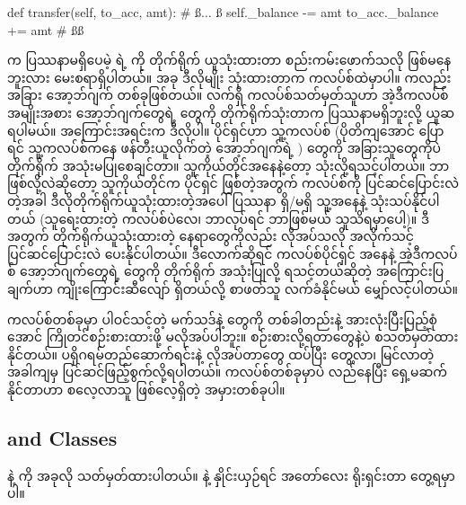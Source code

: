 %
\begin{py}
def transfer(self, to_acc, amt):
    # ß$\ldots$ ß
    self._balance -= amt
    to_acc._balance += amt # ßß
\end{py}
%
 က ပြဿနာမရှိပေမဲ့  ရဲ့   ကို တိုက်ရိုက် ယူသုံးထားတာ  စည်းကမ်းဖောက်သလို ဖြစ်မနေဘူးလား မေးစရာရှိပါတယ်။ အခု ဒီလိုမျိုး သုံးထားတာက  ကလပ်စ်ထဲမှာပါ။  ကလည်း အခြား  အော့ဘ်ဂျက် တစ်ခုဖြစ်တယ်။ လက်ရှိ ကလပ်စ်သတ်မှတ်သူဟာ အဲ့ဒီကလပ်စ်အမျိုးအစား အော့ဘ်ဂျက်တွေရဲ့  တွေကို တိုက်ရိုက်သုံးတာက ပြဿနာမရှိဘူးလို့ ယူဆရပါမယ်။ အကြောင်းအရင်းက ဒီလိုပါ။ ပိုင်ရှင်ဟာ သူ့ကလပ်စ်  (ပိုတိကျအောင် ပြောရင် သူ့ကလပ်စ်ကနေ ဖန်တီးယူလိုက်တဲ့ အော့ဘ်ဂျက်ရဲ့ ) တွေကို အခြားသူတွေကိုပဲ တိုက်ရိုက် အသုံးမပြုစေချင်တာ။ သူကိုယ်တိုင်အနေနဲ့တော့ သုံးလို့ရသင့်ပါတယ်။ ဘာဖြစ်လို့လဲဆိုတော့ သူကိုယ်တိုင်က ပိုင်ရှင် ဖြစ်တဲ့အတွက် ကလပ်စ်ကို ပြင်ဆင်ပြောင်းလဲတဲ့အခါ ဒီလိုတိုက်ရိုက်ယူသုံးထားတဲ့အပေါ် ပြဿနာ ရှိ/မရှိ သူ့အနေနဲ့ သုံးသပ်နိုင်ပါတယ် (သူရေးထားတဲ့ ကလပ်စ်ပဲလေ၊ ဘာလုပ်ရင် ဘာဖြစ်မယ် သူသိရမှာပေါ့)။ ဒီအတွက် တိုက်ရိုက်ယူသုံးထားတဲ့ နေရာတွေကိုလည်း လိုအပ်သလို အလိုက်သင့် ပြင်ဆင်ပြောင်းလဲ ပေးနိုင်ပါတယ်။ ဒီလောက်ဆိုရင် ကလပ်စ်ပိုင်ရှင် အနေနဲ့ အဲ့ဒီကလပ်စ် အော့ဘ်ဂျက်တွေရဲ့  တွေကို တိုက်ရိုက် အသုံးပြုလို့  ရသင့်တယ်ဆိုတဲ့ အကြောင်းပြချက်ဟာ ကျိုးကြောင်းဆီလျော် ရှိတယ်လို့ စာဖတ်သူ လက်ခံနိုင်မယ် မျှော်လင့်ပါတယ်။

ကလပ်စ်တစ်ခုမှာ ပါဝင်သင့်တဲ့ မက်သဒ်နဲ့  တွေကို တစ်ခါတည်းနဲ့ အားလုံးပြီးပြည့်စုံအောင် ကြိုတင်စဉ်းစားထားဖို့ မလိုအပ်ပါဘူး။ စဉ်းစားလို့ရတာတွေနဲ့ပဲ စသတ်မှတ်ထားနိုင်တယ်။ ပရိုဂရမ်တည်ဆောက်ရင်းနဲ့ လိုအပ်တာတွေ ထပ်ပြီး တွေ့လာ၊ မြင်လာတဲ့ အခါကျမှ ပြင်ဆင်ဖြည့်စွက်လို့ရပါတယ်။ ကလပ်စ်တစ်ခုမှာပဲ လည်နေပြီး ရှေ့မဆက်နိုင်တာဟာ စလေ့လာသူ ဖြစ်လေ့ရှိတဲ့ အမှားတစ်ခုပါ။ 
\subsection*{ and  Classes}
 နဲ့  ကို အခုလို သတ်မှတ်ထားပါတယ်။  နဲ့ နှိုင်းယှဉ်ရင် အတော်လေး ရိုးရှင်းတာ တွေ့ရမှာပါ။

